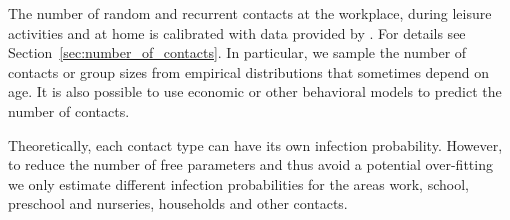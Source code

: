 The number of random and recurrent contacts at the workplace, during leisure activities
and at home is calibrated with data provided by \citet{Mossong2008}. For details see
Section~\ref{sec:number_of_contacts}. In particular, we sample the number of contacts or
group sizes from empirical distributions that sometimes depend on age. It is also
possible to use economic or other behavioral models to predict the number of contacts.

Theoretically, each contact type can have its own infection probability. However, to
reduce the number of free parameters and thus avoid a potential over-fitting we only
estimate different infection probabilities for the areas work, school, preschool and
nurseries, households and other contacts.
